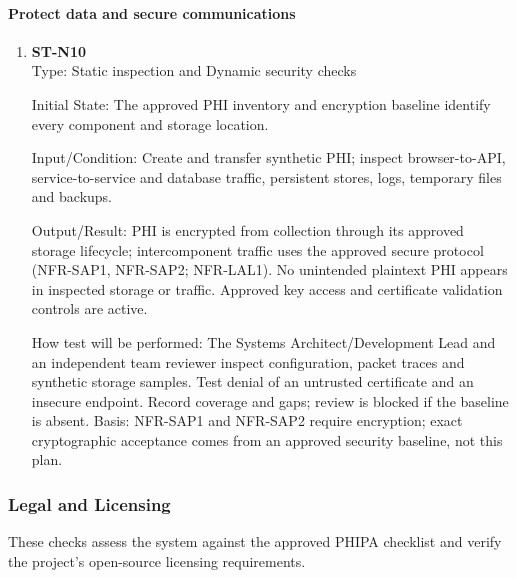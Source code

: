 \documentclass[12pt, titlepage]{article}
\begin{document}
\paragraph{Protect data and secure communications}
\begin{enumerate}
    \item \textbf{ST-N10}\\

    Type: Static inspection and Dynamic security checks

    Initial State: The approved PHI inventory and encryption baseline identify
    every component and storage location.

    Input/Condition: Create and transfer synthetic PHI; inspect browser-to-API,
    service-to-service and database traffic, persistent stores, logs,
    temporary files and backups.

    Output/Result: PHI is encrypted from collection through its approved
    storage lifecycle; intercomponent traffic uses the approved secure
    protocol (NFR-SAP1, NFR-SAP2; NFR-LAL1). No unintended plaintext PHI
    appears in inspected storage or traffic. Approved key access and
    certificate validation controls are active.

    How test will be performed: The Systems Architect/Development Lead and an
    independent team reviewer inspect configuration, packet traces and
    synthetic storage samples. Test denial of an untrusted certificate and an
    insecure endpoint. Record coverage and gaps; review is blocked if the
    baseline is absent. Basis: NFR-SAP1 and NFR-SAP2 require encryption; exact
    cryptographic acceptance comes from an approved security baseline, not this
    plan.
\end{enumerate}

\subsubsection{Legal and Licensing}

These checks assess the system against the approved PHIPA checklist and verify the project's open-source licensing requirements.
\end{document}
